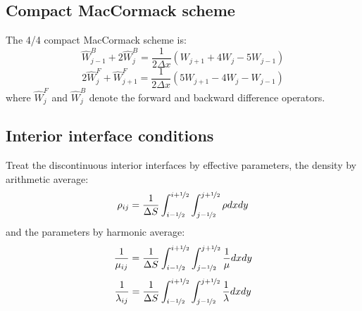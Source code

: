 \subsection{Compact MacCormack scheme}
The 4/4 compact MacCormack scheme is:
\[ \hat W_{j-1}^B+2\hat W_j^B=\frac{1}{2\Delta x}(W_{j+1}+4W_j-5W_{j-1}) \]
\[ 2\hat W_j^F+\hat W_{j+1}^F=\frac{1}{2\Delta x}(5W_{j+1}-4W_j-W_{j-1}) \]
where $\hat W_j^F$ and $\hat W_j^B$ denote the forward and backward difference operators.\par
\subsection{Interior interface conditions}
Treat the discontinuous interior interfaces by effective parameters, the density by arithmetic average:
\[ \rho_{ij}=\frac{1}{\Delta S}\int_{i-\nicefrac{1}{2}}^{i+\nicefrac{1}{2}}\int_{j-\nicefrac{1}{2}}^{j+\nicefrac{1}{2}}\rho dxdy \]
and the \Lame parameters by harmonic average:
\[ \frac{1}{\mu_{ij}}=\frac{1}{\Delta S}\int_{i-\nicefrac{1}{2}}^{i+\nicefrac{1}{2}}\int_{j-\nicefrac{1}{2}}^{j+\nicefrac{1}{2}}\frac{1}{\mu}dxdy \]
\[ \frac{1}{\lambda_{ij}}=\frac{1}{\Delta S}\int_{i-\nicefrac{1}{2}}^{i+\nicefrac{1}{2}}\int_{j-\nicefrac{1}{2}}^{j+\nicefrac{1}{2}}\frac{1}{\lambda}dxdy \]\par
